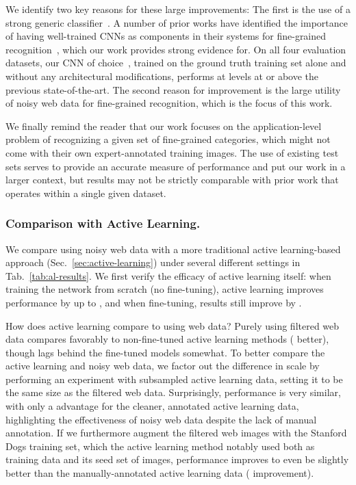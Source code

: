 \documentclass[runningheads]{llncs}
\begin{document}
We identify two key reasons for these large improvements:
The first is the use of a strong generic classifier~\cite{szegedy2015rethinking}.
A number of prior works have identified the importance of having well-trained CNNs as components in their systems for fine-grained recognition~\cite{lin2015bilinear,jaderberg2015spatial,krause2015fine,zhang2014part,branson2014bird}, which our work provides strong evidence for.
On all four evaluation datasets, our CNN of choice~\cite{szegedy2015rethinking}, trained on the ground truth training set alone and without any architectural modifications, performs at levels at or above the previous state-of-the-art.
The second reason for improvement is the large utility of noisy web data for fine-grained recognition, which is the focus of this work.

We finally remind the reader that our work focuses on the application-level problem of recognizing a given set of fine-grained categories, which might not come with their own expert-annotated training images.
The use of existing test sets serves to provide an accurate measure of performance and put our work in a larger context, but results may not be strictly comparable with prior work that operates within a single given dataset.






\subsubsection{Comparison with Active Learning.}
We compare using noisy web data with a more traditional active learning-based approach (Sec.~\ref{sec:active-learning}) under several different settings in Tab.~\ref{tab:al-results}.
We first verify the efficacy of active learning itself: when training the network from scratch (\ie no fine-tuning), active learning improves performance by up to , and when fine-tuning, results still improve by .

How does active learning compare to using web data?
Purely using filtered web data compares favorably to non-fine-tuned active learning methods ( better), though lags behind the fine-tuned models somewhat.
To better compare the active learning and noisy web data, we factor out the difference in scale by performing an experiment with subsampled active learning data, setting it to be the same size as the filtered web data.
Surprisingly, performance is very similar, with only a  advantage for the cleaner, annotated active learning data, highlighting the effectiveness of noisy web data despite the lack of manual annotation.
If we furthermore augment the filtered web images with the Stanford Dogs training set, which the active learning method notably used both as training data and its seed set of images, performance improves to even be slightly better than the manually-annotated active learning data ( improvement).
\end{document}

